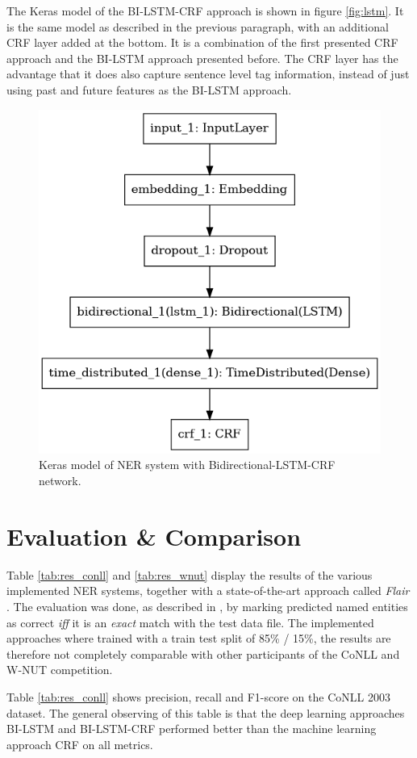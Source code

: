 \documentclass[12pt]{book}
\begin{document}
	The Keras model of the BI-LSTM-CRF approach is shown in figure \ref{fig:lstm}. It is the same model as described in the previous paragraph, with an additional CRF layer added at the bottom. It is a combination of the first presented CRF approach and the BI-LSTM approach presented before. The CRF layer has the advantage that it does also capture sentence level tag information, instead of just using past and future features as the BI-LSTM approach.
	
	\begin{figure}
		\begin{center}
			\includegraphics[width=0.4\linewidth]{img/lstm_crf_model.png}
		\end{center}
		\caption{Keras model of NER system with Bidirectional-LSTM-CRF network.}
		\label{fig:lstm-crf}
	\end{figure}
	

	\chapter{Evaluation \& Comparison}
	\label{chap:evaluation}
	
	Table \ref{tab:res_conll} and \ref{tab:res_wnut} display the results of the various implemented NER systems, together with a state-of-the-art approach called \textit{Flair} \cite{akbik2019flair}. The evaluation was done, as described in \cite{tjongkimsang2003conll}, by marking predicted named entities as correct \textit{iff} it is an \textit{exact} match with the test data file. The implemented approaches where trained with a train test split of 85\% / 15\%, the results are therefore not completely comparable with other participants of the CoNLL and W-NUT competition.
	
	Table \ref{tab:res_conll} shows precision, recall and F1-score on the CoNLL 2003 dataset. The general observing of this table is that the deep learning approaches BI-LSTM and BI-LSTM-CRF performed better than the machine learning approach CRF on all metrics.
	
\end{document}
